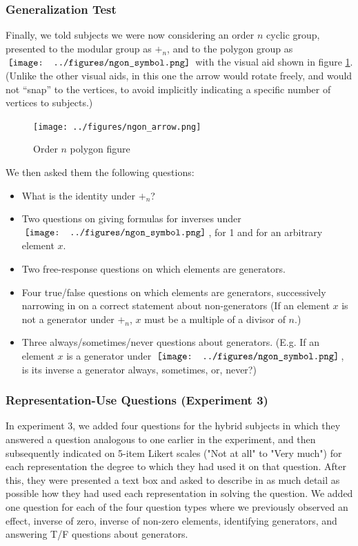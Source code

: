 \documentclass[man,10pt]{apa6}
\newcommand{\ngon}{\,\vcenter{\hbox{\texttt{[image: ../figures/ngon\_symbol.png]}}}\,}
\begin{document}
\subsubsection{Generalization Test}
Finally, we told subjects we were now considering an order $n$ cyclic group, presented to the modular group as $+_n$, and to the polygon group as $\ngon$ with the visual aid shown in figure \ref{ngonex}. (Unlike the other visual aids, in this one the arrow would rotate freely, and would not ``snap'' to the vertices, to avoid implicitly indicating a specific number of vertices to subjects.) 
\begin{figure} \centering \texttt{[image: ../figures/ngon\_arrow.png]} \caption{Order $n$ polygon figure} \label{ngonex} \end{figure} \noindent
We then asked them the following questions: 
\begin{itemize}
\item What is the identity under $+_n$?
\item Two questions on giving formulas for inverses under $\ngon$, for 1 and for an arbitrary element $x$.
\item Two free-response questions on which elements are generators. 
\item Four true/false questions on which elements are generators, successively narrowing in on a correct statement about non-generators (If an element $x$ is not a generator under $+_n$, $x$ must be a multiple of a divisor of $n$.)
\item Three always/sometimes/never questions about generators. (E.g. If an element $x$ is a generator under $\ngon$, is its inverse a generator always, sometimes, or, never?) 
\end{itemize}
\subsubsection{Representation-Use Questions (Experiment 3)}
In experiment 3, we added four questions for the hybrid subjects in which they answered a question analogous to one earlier in the experiment, and then subsequently indicated on 5-item Likert scales ("Not at all" to "Very much") for each representation the degree to which they had used it on that question. After this, they were presented a text box and asked to describe in as much detail as possible how they had used each representation in solving the question. We added one question for each of the four question types where we previously observed an effect, inverse of zero, inverse of non-zero elements, identifying generators, and answering T/F questions about generators.
\end{document}
